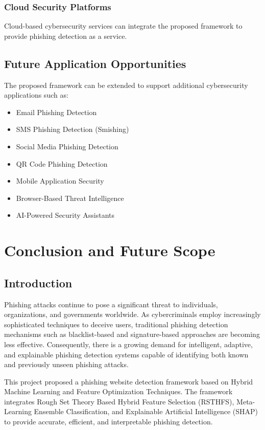 \documentclass[12pt]{report}
\begin{document}
\subsection{Cloud Security Platforms}

Cloud-based cybersecurity services can integrate the proposed framework to provide phishing detection as a service.

\section{Future Application Opportunities}

The proposed framework can be extended to support additional cybersecurity applications such as:

\begin{itemize}
    \item Email Phishing Detection
    \item SMS Phishing Detection (Smishing)
    \item Social Media Phishing Detection
    \item QR Code Phishing Detection
    \item Mobile Application Security
    \item Browser-Based Threat Intelligence
    \item AI-Powered Security Assistants
\end{itemize}


\chapter{Conclusion and Future Scope}

\section{Introduction}

Phishing attacks continue to pose a significant threat to individuals, organizations, and governments worldwide. As cybercriminals employ increasingly sophisticated techniques to deceive users, traditional phishing detection mechanisms such as blacklist-based and signature-based approaches are becoming less effective. Consequently, there is a growing demand for intelligent, adaptive, and explainable phishing detection systems capable of identifying both known and previously unseen phishing attacks.

This project proposed a phishing website detection framework based on Hybrid Machine Learning and Feature Optimization Techniques. The framework integrates Rough Set Theory Based Hybrid Feature Selection (RSTHFS), Meta-Learning Ensemble Classification, and Explainable Artificial Intelligence (SHAP) to provide accurate, efficient, and interpretable phishing detection.
\end{document}
